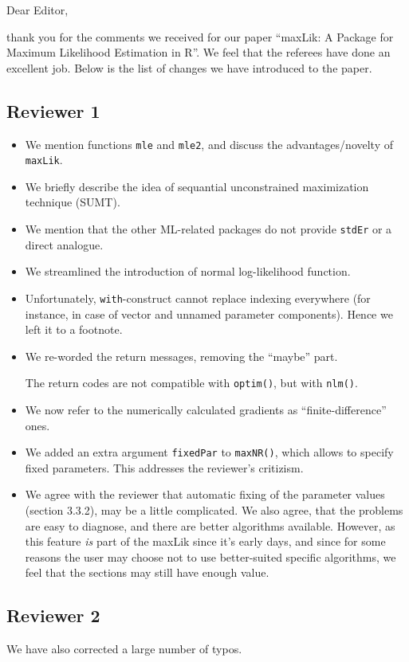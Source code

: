 \documentclass[a4paper]{article}
\begin{document}
Dear Editor,

thank you for the comments we received for our paper ``maxLik: A
Package for Maximum Likelihood Estimation in R''.  We feel that the
referees have done an excellent job.  Below is the list of changes we
have introduced to the paper.

\subsection*{Reviewer 1}

\begin{itemize}
\item We mention functions \texttt{mle} and \texttt{mle2}, and discuss
  the advantages/novelty of \texttt{maxLik}.
\item We briefly describe the idea of sequantial unconstrained
  maximization technique (SUMT).
\item We mention that the other ML-related packages do not provide
  \texttt{stdEr} or a direct analogue.
\item We streamlined the introduction of normal log-likelihood function.
\item Unfortunately, \texttt{with}-construct cannot replace indexing
  everywhere (for instance, in case of vector and unnamed
  parameter components).  Hence we left it to a footnote.
\item We re-worded the return messages, removing the ``maybe'' part.

  The return codes are not compatible with \texttt{optim()},
  but with \texttt{nlm()}.
\item We now refer to the numerically calculated gradients as
  ``finite-difference'' ones.
\item We added an extra argument \texttt{fixedPar} to
  \texttt{maxNR()}, which allows to specify fixed parameters.  This
  addresses the reviewer's critizism.
\item We agree with the reviewer that automatic fixing of the
  parameter values (section 3.3.2), may be a little complicated.  We
  also agree, that the problems are easy to diagnose, and there are
  better algorithms available.  However, as this feature \emph{is}
  part of the maxLik since it's early days, and since for some reasons
  the user may choose not to use better-suited specific algorithms, we
  feel that the sections may still have enough value.
\end{itemize}

\subsection*{Reviewer 2}




We have also corrected a large number of typos.



\end{document}
